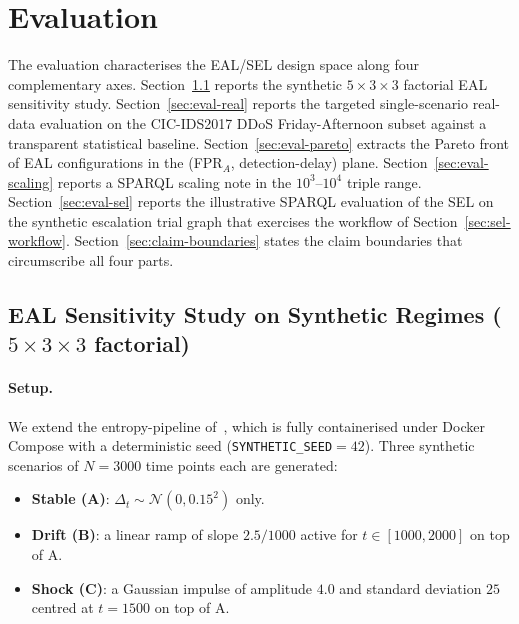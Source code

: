 \documentclass[runningheads]{llncs}
\begin{document}
\section{Evaluation}
\label{sec:evaluation}

The evaluation characterises the EAL/SEL design space along four
complementary axes. Section~\ref{sec:eval-eal} reports the synthetic
$5\times 3\times 3$ factorial EAL sensitivity study.
Section~\ref{sec:eval-real} reports the targeted single-scenario
real-data evaluation on the CIC-IDS2017 DDoS Friday-Afternoon subset
against a transparent statistical baseline.
Section~\ref{sec:eval-pareto} extracts the Pareto front of EAL
configurations in the (FPR$_A$, detection-delay) plane.
Section~\ref{sec:eval-scaling} reports a SPARQL scaling note in the
$10^{3}$--$10^{4}$ triple range. Section~\ref{sec:eval-sel} reports the
illustrative SPARQL evaluation of the SEL on the synthetic escalation
trial graph that exercises the workflow of
Section~\ref{sec:sel-workflow}. Section~\ref{sec:claim-boundaries}
states the claim boundaries that circumscribe all four parts.

\subsection{EAL Sensitivity Study on Synthetic Regimes
(\texorpdfstring{$5 \times 3 \times 3$}{5x3x3} factorial)}
\label{sec:eval-eal}

\paragraph{Setup.} We extend the entropy-pipeline of~\cite{berto2026},
which is fully containerised under Docker Compose with a deterministic
seed (\texttt{SYNTHETIC\_SEED}$=42$). Three synthetic scenarios of $N=3000$
time points each are generated:

\begin{itemize}[leftmargin=*]
\item \textbf{Stable (A)}: $\Delta_t \sim \mathcal{N}(0, 0.15^2)$ only.
\item \textbf{Drift (B)}: a linear ramp of slope $2.5/1000$ active for
  $t \in [1000, 2000]$ on top of A.
\item \textbf{Shock (C)}: a Gaussian impulse of amplitude $4.0$ and
  standard deviation $25$ centred at $t = 1500$ on top of A.
\end{itemize}
\end{document}
